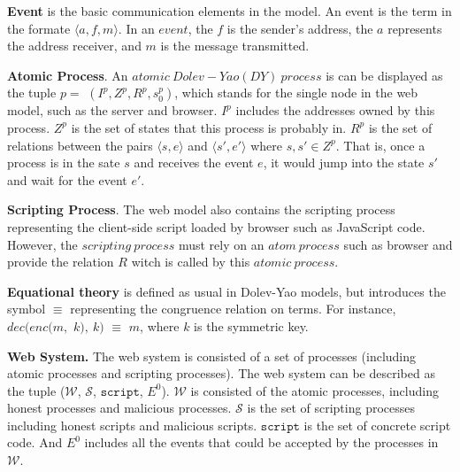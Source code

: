 \vspace{1mm}\noindent\textbf{Event } is the basic communication elements in the model.  An event is the term in the formate $\langle a, f, m \rangle$. In an $event$, the $f$ is the sender's address, the $a$ represents the address receiver, and $m$ is the message transmitted. 

\vspace{1mm}\noindent\textbf{Atomic Process}.  An $atomic\ Dolev-Yao (DY)\ process$ is can be displayed as the tuple $p=$ $(I^p, Z^p, R^p,s_0^p )$, which stands for the single node in the web model, such as the server and browser. $I^p$ includes the addresses owned by this process. $Z^p$ is the set of states that this process is probably in. $R^p$ is the set of relations between the pairs $\langle s, e \rangle$ and $\langle s', e' \rangle$ where $s, s' \in Z^p$.
That is, once a process is in the sate $s$ and receives the event $e$, it would jump into the state $s'$ and wait for the event $e'$.

\vspace{1mm}\noindent\textbf{Scripting Process}. The web model also contains the scripting process representing the client-side script loaded by browser such as JavaScript code. However, the $scripting\ process$ must rely on an $atom\ process$ such as browser and provide the relation $R$ witch is called by this $atomic\ process$. 

\vspace{1mm}\noindent\textbf{Equational theory } is defined as usual in Dolev-Yao models,  but introduces the symbol $\equiv$ representing the congruence relation on terms. For instance,  $dec(enc(m,$ $ k),\ k)$ $\equiv$ $m$, where $k$ is the symmetric key.

\vspace{1mm}\noindent\textbf{Web System. }
The web system is consisted of a set of processes (including atomic processes and scripting processes). The web system can be described as the tuple ($\mathcal{W}$, $\mathcal{S}$, $\mathtt{script}$, $E^0$). $\mathcal{W}$ is consisted of the atomic processes, including honest processes and malicious processes. $\mathcal{S}$ is the set of scripting processes including honest scripts and malicious scripts. $\mathtt{script}$ is the set of concrete script code. And $E^0$ includes all the events that could be accepted by the processes in $\mathcal{W}$. 

